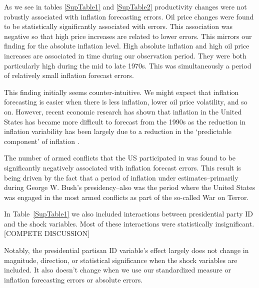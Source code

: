 \documentclass[a4paper]{article}\usepackage[]{graphicx}\usepackage[]{color}
\begin{document}
As we see in tables \ref{SupTable1} and \ref{SupTable2} productivity changes were not robustly associated with inflation forecasting errors. Oil price changes were found to be statistically significantly associated with errors. This association was negative so that high price increases are related to lower errors. This mirrors our finding for the absolute inflation level. High absolute inflation and high oil price increases are associated in time during our observation period. They were both particularly high during the mid to late 1970s. This was simultaneously a period of relatively small inflation forecast errors. 

This finding initially seems counter-intuitive. We might expect that inflation forecasting is easier when there is less inflation, lower oil price volatility, and so on. However, recent economic research has shown that inflation in the United States has became more difficult to forecast from the 1990s as the reduction in inflation variability has been largely due to a reduction in the `predictable component' of inflation \citep[see][]{Gamber2009}. 

The number of armed conflicts that the US participated in was found to be significantly negatively associated with inflation forecast errors. This result is being driven by the fact that a period of inflation under estimates--primarily during George W. Bush's presidency--also was the period where the United States was engaged in the most armed conflicts as part of the so-called War on Terror. 

In Table~\ref{SupTable1} we also included interactions between presidential party ID and the shock variables. Most of these interactions were statistically insignificant. [COMPETE DISCUSSION]

Notably, the presidential partisan ID variable's effect largely does not change in magnitude, direction, or statistical significance when the shock variables are included. It also doesn't change when we use our standardized measure or inflation forecasting errors or absolute errors.
\end{document}
